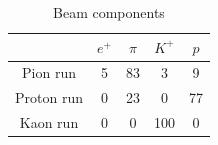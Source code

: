 \begin{table}
  \centering
  \caption{Beam components}
  \begin{tabular}[htb]{c|cccc} \hline
               & $e^{+}$ & $\pi$ & $K^{+}$ & $p$ \\ \hline
    Pion run   & 5       & 83    & 3       & 9   \\
    Proton run & 0       & 23    & 0       & 77  \\ 
    Kaon run   & 0       & 0     & 100     & 0   \\ \hline
  \end{tabular}
  \label{tb:beam_component}
\end{table}
